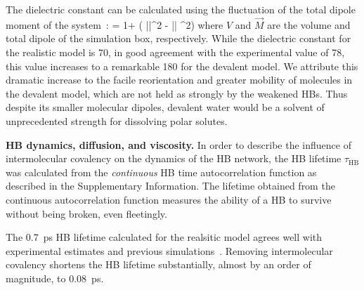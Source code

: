 \documentclass[aps,prl,reprint,amsmath,amssymb]{revtex4-1}
\begin{document}
The dielectric constant can be calculated using the fluctuation of the total dipole moment of the system~\cite{neumann1983dipole,adams1981theory}:
%
\bea
\epsilon = 1+  (  \langle ||^2 \rangle  - \langle || \rangle ^2) \label{Eq:dielectric}
\eea
%
where $V$ and $\vec{M}$ are the volume and total dipole of the simulation box, respectively. 
While the dielectric constant for the realistic model is 70, in good agreement with the experimental value of 78, this value increases to a remarkable 180 for the devalent model.
We attribute this dramatic increase to the facile reorientation and greater mobility of molecules in the devalent model, which are not held as strongly by the weakened HBs. 
Thus despite its smaller molecular dipoles, devalent water would be a solvent of unprecedented strength for dissolving polar solutes.

\textbf{HB dynamics, diffusion, and viscosity.} In order to describe the influence of intermolecular covalency on the dynamics of the HB network, the HB lifetime $\tau_{\text{HB}}$ was calculated from the \emph{continuous} HB time autocorrelation function as described in the Supplementary Information. The lifetime obtained from the continuous autocorrelation function measures the ability of a HB to survive without being broken, even fleetingly.

The 0.7~ps HB lifetime calculated for the realsitic model agrees well with experimental estimates \cite{lawrence2003ultrafast} and previous simulations~\cite{marti1996molecular,starr1999fast}. Removing intermolecular covalency shortens the HB lifetime substantially, almost by an order of magnitude, to 0.08~ps. 

\end{document}
